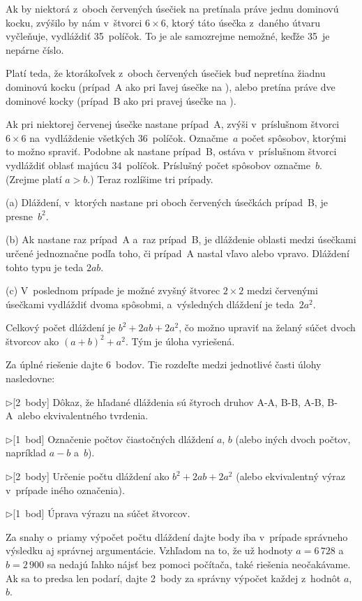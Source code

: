 {%
Ak by niektorá z~oboch červených úsečiek na \obr{} pretínala práve jednu
dominovú kocku, zvýšilo by nám v~štvorci $6\times 6$,
ktorý táto úsečka z~daného útvaru vyčleňuje,
vydláždiť 35~políčok. To je ale samozrejme nemožné, keďže 35~je nepárne
číslo.

Platí teda, že ktorákoľvek z~oboch červených úsečiek buď nepretína žiadnu
dominovú kocku (prípad~A ako pri ľavej úsečke na ), alebo pretína práve dve
dominové kocky (prípad~B ako pri pravej úsečke na ).
%

Ak pri niektorej červenej úsečke nastane prípad~A, zvýši v~príslušnom
štvorci $6\times 6$ na~vydláždenie všetkých 36~políčok. Označme~$a$ počet
spôsobov, ktorými to možno spraviť. Podobne ak nastane prípad~B, ostáva
v~príslušnom štvorci vydláždiť oblasť majúcu 34~políčok. Príslušný
počet spôsobov označme~$b$. (Zrejme platí $a>b$.) Teraz rozlíšime tri prípady.

\ite(a)
Dláždení, v~ktorých nastane pri oboch červených úsečkách prípad~B, je
presne~$b^2$.

\ite(b)
Ak nastane raz prípad~A a~raz prípad~B, je dláždenie
oblasti medzi úsečkami určené jednoznačne podľa toho, či prípad~A nastal
vľavo alebo vpravo. Dláždení tohto typu je teda $2ab$.

\ite(c)
V~poslednom prípade  je možné zvyšný štvorec $2\times2$
medzi červenými úsečkami
vydláždiť dvoma spôsobmi, a~výsledných dláždení je teda~$2a^2$.

Celkový počet dláždení je $b^2 + 2ab + 2a^2$, čo možno upraviť na
želaný súčet dvoch štvorcov ako $(a+b)^2 + a^2$. Tým je úloha
vyriešená.

\nobreak\medskip\petit\noindent
Za úplné riešenie dajte 6~bodov.
Tie rozdeľte medzi jednotlivé časti úlohy nasledovne:
\item{$\triangleright$}[2~body] Dôkaz, že hľadané dláždenia sú štyroch druhov A-A, B-B,
A-B, B-A~alebo ekvivalentného tvrdenia.

\item{$\triangleright$}[1~bod] Označenie počtov čiastočných dláždení $a$, $b$ (alebo
iných dvoch počtov, napríklad $a-b$ a~$b$).

\item{$\triangleright$}[2~body] Určenie počtu dláždení ako $b^2 + 2ab + 2a^2$
(alebo ekvivalentný výraz v~prípade iného označenia).

\item{$\triangleright$}[1~bod] Úprava výrazu na súčet štvorcov.

Za snahy o~priamy výpočet počtu dláždení dajte body iba v~prípade
správneho výsledku aj správnej argumentácie. Vzhľadom na to, že už
hodnoty $a= 6\,728$ a~$b = 2\,900$ sa nedajú ľahko nájsť bez pomoci počítača,
také riešenia neočakávame. Ak sa to predsa len podarí, dajte 2~body
za správny výpočet každej z~hodnôt $a$, $b$.
\endpetit
\bigbreak}

